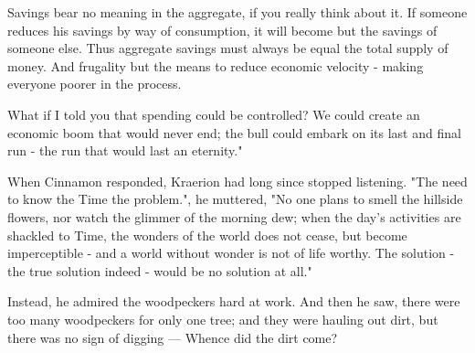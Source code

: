 Savings bear no meaning in the aggregate, if you really think about it. If someone reduces his savings by way of consumption, it will become  but the savings of someone else. Thus aggregate savings must always be equal the total supply of money. And frugality but the means to reduce economic velocity - making everyone poorer in the process.

What if I told you that spending could be controlled? We could create an economic boom that would never end; the bull could embark on its last and final run - the run that would last an eternity."

When Cinnamon responded, Kraerion had long since stopped listening. "The need to know the Time  the problem.", he muttered, "No one plans to smell the hillside flowers, nor watch the glimmer of the morning dew; when the day's activities are shackled to Time, the wonders of the world does not cease, but become imperceptible - and a world without wonder is not of life worthy. The solution - the true solution indeed - would be no solution at all."

Instead, he admired the woodpeckers hard at work. And then he saw, there were too many woodpeckers for only one tree; and they were hauling out dirt, but there was no sign of digging — Whence did the dirt come? 






